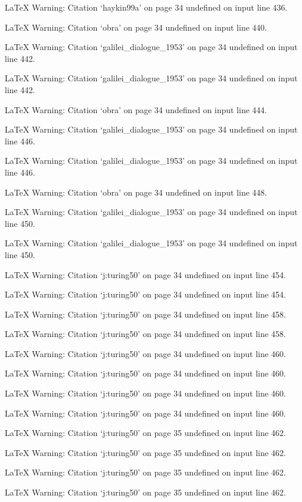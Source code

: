 LaTeX Warning: Citation `haykin99a' on page 34 undefined on input line 436.


LaTeX Warning: Citation `obra' on page 34 undefined on input line 440.


LaTeX Warning: Citation `galilei_dialogue_1953' on page 34 undefined on input line 442.


LaTeX Warning: Citation `galilei_dialogue_1953' on page 34 undefined on input line 442.


LaTeX Warning: Citation `obra' on page 34 undefined on input line 444.


LaTeX Warning: Citation `galilei_dialogue_1953' on page 34 undefined on input line 446.


LaTeX Warning: Citation `galilei_dialogue_1953' on page 34 undefined on input line 446.


LaTeX Warning: Citation `obra' on page 34 undefined on input line 448.


LaTeX Warning: Citation `galilei_dialogue_1953' on page 34 undefined on input line 450.


LaTeX Warning: Citation `galilei_dialogue_1953' on page 34 undefined on input line 450.


LaTeX Warning: Citation `j:turing50' on page 34 undefined on input line 454.


LaTeX Warning: Citation `j:turing50' on page 34 undefined on input line 454.


LaTeX Warning: Citation `j:turing50' on page 34 undefined on input line 458.


LaTeX Warning: Citation `j:turing50' on page 34 undefined on input line 458.


LaTeX Warning: Citation `j:turing50' on page 34 undefined on input line 460.


LaTeX Warning: Citation `j:turing50' on page 34 undefined on input line 460.


LaTeX Warning: Citation `j:turing50' on page 34 undefined on input line 460.


LaTeX Warning: Citation `j:turing50' on page 34 undefined on input line 460.


LaTeX Warning: Citation `j:turing50' on page 35 undefined on input line 462.


LaTeX Warning: Citation `j:turing50' on page 35 undefined on input line 462.


LaTeX Warning: Citation `j:turing50' on page 35 undefined on input line 462.


LaTeX Warning: Citation `j:turing50' on page 35 undefined on input line 462.


